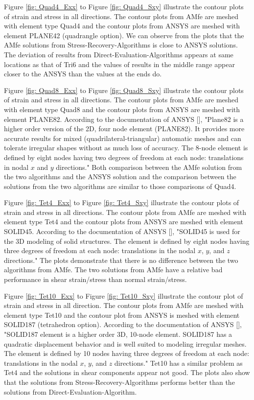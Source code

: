 Figure \ref{fig: Quad4_Exx} to Figure \ref{fig: Quad4_Sxy} illustrate the contour plots of strain and stress in all directions. The contour plots from AMfe are meshed with element type Quad4 and the contour plots from ANSYS are meshed with element PLANE42 (quadrangle option). We can observe from the plots that the AMfe solutions from Stress-Recovery-Algorithms is close to ANSYS solutions. The deviation of results from Direct-Evaluation-Algorithms appears at same locations as that of Tri6 and the values of results in the middle range appear closer to the ANSYS than the values at the ends do.

Figure \ref{fig: Quad8_Exx} to Figure \ref{fig: Quad8_Sxy} illustrate the contour plots of strain and stress in all directions. The contour plots from AMfe are meshed with element type Quad8 and the contour plots from ANSYS are meshed with element PLANE82. According to the documentation of ANSYS [\cite{APDL}], "Plane82 is a higher order version of the 2D, four node element (PLANE82). It provides more accurate results for mixed (quadrilateral-triangular) automatic meshes and can tolerate irregular shapes without as much loss of accuracy. The 8-node element is defined by eight nodes having two degrees of freedom at each node: translations in nodal $x$ and $y$ directions." Both comparison between the AMfe solution from the two algorithms and the ANSYS solution and the comparison between the solutions from the two algorithms are similar to those comparisons of Quad4. 

Figure \ref{fig: Tet4_Exx} to Figure \ref{fig: Tet4_Sxy} illustrate the contour plots of strain and stress in all directions. The contour plots from AMfe are meshed with element type Tet4 and the contour plots from ANSYS are meshed with element SOLID45. According to the documentation of ANSYS [\cite{APDL}], "SOLID45 is used for the 3D modeling of solid structures. The element is defined by eight nodes having three degrees of freedom at each node: translations in the nodal $x$, $y$, and $z$ directions." The plots demonstrate that there is no difference between the two algorithms from AMfe. The two solutions from AMfe have a relative bad performance in shear strain/stress than normal strain/stress. 

Figure \ref{fig: Tet10_Exx} to Figure \ref{fig: Tet10_Sxy} illustrate the contour plot of strain and stress in all direction. The contour plots from AMfe are meshed with element type Tet10 and the contour plot from ANSYS is meshed with element SOLID187 (tetrahedron option). According to the documentation of ANSYS [\cite{APDL}], "SOLID187 element is a higher order 3D, 10-node element. SOLID187 has a quadratic displacement behavior and is well suited to modeling irregular meshes. The element is defined by 10 nodes having three degrees of freedom at each node: translations in the nodal $x$, $y$, and $z$ directions." Tet10 has a similar problem as Tet4 and the solutions in shear components appear not good. The plots also show that the solutions from Stress-Recovery-Algorithms performs better than the solutions from Direct-Evaluation-Algorithm. 

